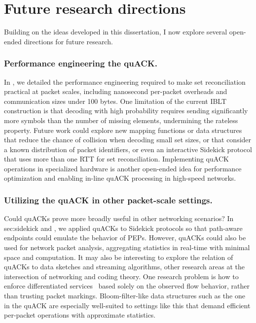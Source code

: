 \section{Future research directions}
\label{sec:conclusion:future}

Building on the ideas developed in this dissertation, I now explore several
open-ended directions for future research.

\subsubsection{Performance engineering the quACK.}

In , we detailed the performance engineering required to make
set reconciliation practical at packet scales, including nanosecond per-packet
overheads and communication sizes under 100 bytes. One limitation of the
current IBLT construction is that decoding with high probability requires
sending significantly more symbols than the number of missing elements,
undermining the rateless property. Future work could explore new mapping
functions or data structures that reduce the chance of collision when decoding
small set sizes, or that consider a known distribution of packet identifiers,
or even an interactive Sidekick protocol that uses more than one RTT for set
reconciliation. Implementing quACK operations in specialized hardware is
another open-ended idea for performance optimization and enabling in-line
quACK processing in high-speed networks.

\subsubsection{Utilizing the quACK in other packet-scale settings.}

Could quACKs prove more broadly useful in other networking scenarios? In \Cref
{sec:sidekick} and , we applied quACKs to Sidekick protocols
so that path-aware endpoints could emulate the behavior of PEPs. However,
quACKs could also be used for network packet analysis, aggregating statistics
in real-time with minimal space and computation. It may also be interesting to
explore the relation of quACKs to data sketches and streaming algorithms, other
research areas at the intersection of networking and coding theory. One
research problem is how to enforce differentiated services~\cite{rfc3260}
based solely on the observed flow behavior, rather than trusting packet
markings. Bloom-filter-like data structures such as the one in the quACK are
especially well-suited to settings like this that demand efficient per-packet
operations with approximate statistics.

